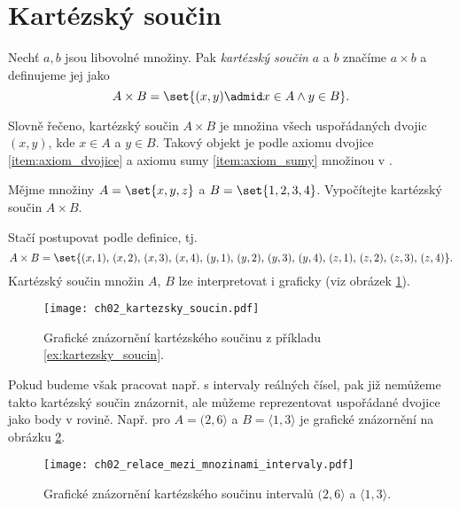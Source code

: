 \section{Kartézský součin}\label{sec:kartezsky_soucin}
\begin{definition}\label{def:kartezsky_soucin}
    Nechť $a,b$ jsou libovolné množiny. Pak \emph{kartézský součin} $a$ a $b$ značíme $a\times b$ a definujeme jej jako
    \begin{equation*}
        A\times B=\set{(x,y) \admid x\in A \land y\in B}.
    \end{equation*}
\end{definition}
Slovně řečeno, kartézský součin $A\times B$ je množina všech uspořádaných dvojic $(x,y)$, kde $x\in A$ a $y\in B$. Takový objekt je podle axiomu dvojice \ref{item:axiom_dvojice} a axiomu sumy \ref{item:axiom_sumy} množinou v \ZF{}.
\begin{example}\label{ex:kartezsky_soucin}
    Mějme množiny $A=\set{x,y,z}$ a $B=\set{1,2,3,4}$. Vypočítejte kartézský součin $A\times B$.
\end{example}
\begin{solution}
    Stačí postupovat podle definice, tj.
    \begin{equation*}
        A\times B=\set{(x,1),\,(x,2),\,(x,3),\,(x,4),\,(y,1),\,(y,2),\,(y,3),\,(y,4),\,(z,1),\,(z,2),\,(z,3),\,(z,4)}.
    \end{equation*}
    Kartézský součin množin $A,\,B$ lze interpretovat i graficky (viz obrázek \ref{fig:kartezsky_soucin}).
\end{solution}
\begin{figure}[H]
    \centering
    \texttt{[image: ch02\_kartezsky\_soucin.pdf]}
    \caption{Grafické znázornění kartézského součinu z příkladu \ref{ex:kartezsky_soucin}.}
    \label{fig:kartezsky_soucin}
\end{figure}
Pokud budeme však pracovat např. s intervaly reálných čísel, pak již nemůžeme takto kartézský součin znázornit, ale můžeme reprezentovat uspořádané dvojice jako body v rovině. Např. pro $A=(2, 6\rangle$ a $B=\langle 1,3 \rangle$ je grafické znázornění na obrázku \ref{fig:kartezsky_soucin_intervaly}.
\begin{figure}[H]
    \centering
    \texttt{[image: ch02\_relace\_mezi\_mnozinami\_intervaly.pdf]}
    \caption{Grafické znázornění kartézského součinu intervalů $(2, 6\rangle$ a $\langle 1,3 \rangle$.}
    \label{fig:kartezsky_soucin_intervaly}
\end{figure}
